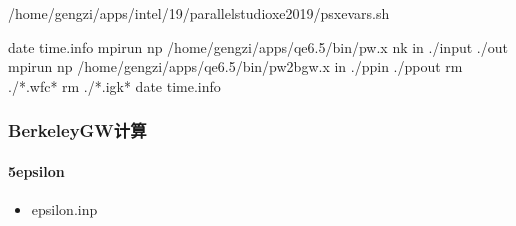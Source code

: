 \documentclass[a4paper,12pt,english]{sphinxmanual}
\begin{document}
\begin{sphinxVerbatim}[commandchars=\\\{\}]


 
 /home/gengzi/apps/intel/19/parallel\PYGZus{}studio\PYGZus{}xe\PYGZus{}2019/psxevars.sh

date  \PYGZgt{}\PYGZgt{} time.info
mpirun \PYGZhy{}np  /home/gengzi/apps/qe\PYGZhy{}6.5/bin/pw.x \PYGZhy{}nk   \PYGZhy{}in ./input \PYGZgt{} ./out
mpirun \PYGZhy{}np  /home/gengzi/apps/qe\PYGZhy{}6.5/bin/pw2bgw.x \PYGZhy{}in ./pp\PYGZus{}in \PYGZgt{} ./pp\PYGZus{}out
rm ./*.wfc*
rm ./*.igk*
date  \PYGZgt{}\PYGZgt{} time.info
\end{sphinxVerbatim}


\subsubsection{BerkeleyGW计算}
\label{\detokenize{tutorials/berkeleygw/gw:berkeleygw}}

\paragraph{5\sphinxhyphen{}epsilon}
\label{\detokenize{tutorials/berkeleygw/gw:epsilon}}\begin{itemize}
\item {} 
\sphinxAtStartPar
epsilon.inp

\end{itemize}
\end{document}
